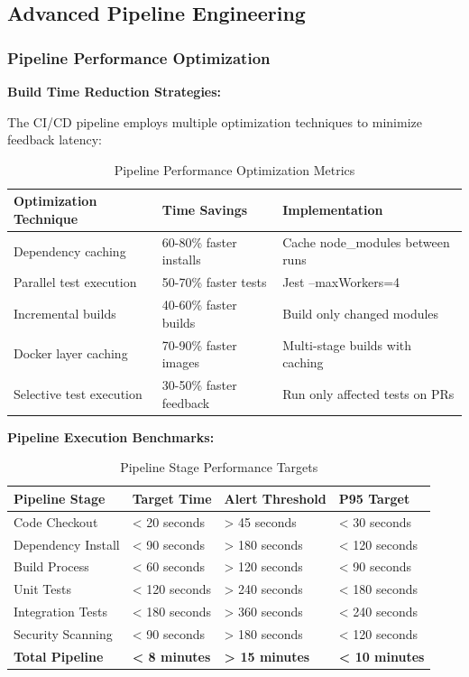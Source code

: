 \documentclass[12pt,a4paper]{article}
\begin{document}
\subsection{Advanced Pipeline Engineering}

\subsubsection{Pipeline Performance Optimization}

\textbf{Build Time Reduction Strategies:}

The CI/CD pipeline employs multiple optimization techniques to minimize feedback latency:

\begin{table}[H]
\centering
\begin{tabular}{|p{5cm}|p{4cm}|p{4cm}|}
\hline
\textbf{Optimization Technique} & \textbf{Time Savings} & \textbf{Implementation} \\
\hline
Dependency caching & 60-80\% faster installs & Cache node\_modules between runs \\
\hline
Parallel test execution & 50-70\% faster tests & Jest --maxWorkers=4 \\
\hline
Incremental builds & 40-60\% faster builds & Build only changed modules \\
\hline
Docker layer caching & 70-90\% faster images & Multi-stage builds with caching \\
\hline
Selective test execution & 30-50\% faster feedback & Run only affected tests on PRs \\
\hline
\end{tabular}
\caption{Pipeline Performance Optimization Metrics}
\end{table}

\vspace{0.5em}

\textbf{Pipeline Execution Benchmarks:}

\begin{table}[H]
\centering
\begin{tabular}{|p{4cm}|p{3cm}|p{3cm}|p{3cm}|}
\hline
\textbf{Pipeline Stage} & \textbf{Target Time} & \textbf{Alert Threshold} & \textbf{P95 Target} \\
\hline
Code Checkout & < 20 seconds & > 45 seconds & < 30 seconds \\
\hline
Dependency Install & < 90 seconds & > 180 seconds & < 120 seconds \\
\hline
Build Process & < 60 seconds & > 120 seconds & < 90 seconds \\
\hline
Unit Tests & < 120 seconds & > 240 seconds & < 180 seconds \\
\hline
Integration Tests & < 180 seconds & > 360 seconds & < 240 seconds \\
\hline
Security Scanning & < 90 seconds & > 180 seconds & < 120 seconds \\
\hline
\textbf{Total Pipeline} & \textbf{< 8 minutes} & \textbf{> 15 minutes} & \textbf{< 10 minutes} \\
\hline
\end{tabular}
\caption{Pipeline Stage Performance Targets}
\end{table}
\end{document}

